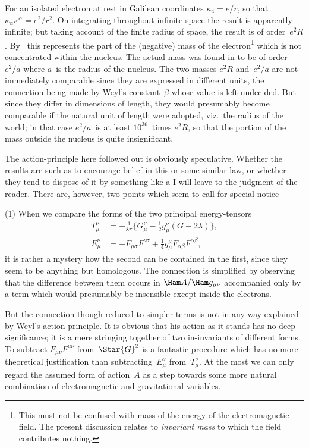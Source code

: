 \documentclass[12pt]{book}
\begin{document}
For an isolated electron at rest in Galilean coordinates $\kappa_{4} = e/r$, so that
$\kappa_{\alpha} \kappa^{\alpha} = e^{2}/r^{2}$. On integrating throughout infinite space the result is apparently
infinite; but taking account of the finite radius of space, the result is of order~$e^{2}R$.
By~ this represents the part of the (negative) mass of the electron\footnote
  {This must not be confused with mass of the energy of the electromagnetic field. The present
  discussion relates to \emph{invariant mass} to which the field contributes nothing.}
which is not concentrated within the nucleus. The actual mass was found in
 to be of order~$e^{2}/a$ where $a$~is the radius of the nucleus. The two masses
$e^{2}R$ and~$e^{2}/a$ are not immediately comparable since they are expressed in
different units, the connection being made by Weyl's constant~$\beta$ whose value
is left undecided. But since they differ in dimensions of length, they would
presumably become comparable if the natural unit of length were adopted,
viz.\ the radius of the world; in that case $e^{2}/a$~is at least $10^{36}$~times $e^{2}R$, so that
the portion of the mass outside the nucleus is quite insignificant.

The action\hyp{}principle here followed out is obviously speculative. Whether
the results are such as to encourage belief in this or some similar law, or whether
they tend to dispose of it by something like a  I will
leave to the judgment of the reader. There are, however, two points which
seem to call for special notice---

(1) When we compare the forms of the two principal energy\hyp{}tensors
\begin{align*}
  T_{\mu}^{\nu} &= -\frac{1}{8\pi} \bigl\{G_{\mu}^{\nu} - \tfrac{1}{2} g_{\mu}^{\nu} (G - 2\lambda)\bigr\}, \\
  E_{\mu}^{\nu} &= -F_{\mu\sigma} F^{\nu\sigma} + \tfrac{1}{4} g_{\mu}^{\nu} F_{\alpha\beta} F^{\alpha\beta},
\end{align*}
it is rather a mystery how the second can be contained in the first, since they
seem to be anything but homologous. The connection is simplified by observing
that the difference between them occurs in $\Ham A/\Ham g_{\mu\nu}$  accompanied only
by a term which would presumably be insensible except inside the electrons.

But the connection though reduced to simpler terms is not in any way
explained by Weyl's action\hyp{}principle. It is obvious that his action as it stands
has no deep significance; it is a mere stringing together of two in\hyp{}invariants
of different forms. To subtract $F_{\mu\nu}F^{\mu\nu}$ from~$\Star{G}^{2}$ is a fantastic procedure which
has no more theoretical justification than subtracting~$E_{\mu}^{\nu}$ from~$T_{\mu}^{\nu}$. At the
most we can only regard the assumed form of action~$A$ as a step towards some
more natural combination of electromagnetic and gravitational variables.
\end{document}
